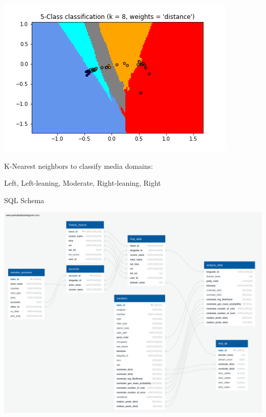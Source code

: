 \documentclass[12pt]{article}
\theoremstyle{example}
\theoremstyle{defn}
\begin{document}
\vspace*{-20pt}
\hspace*{\fill}
\includegraphics[scale=0.4]{5class.png}
\hspace*{\fill}

\vspace*{-10pt}
{\small
K-Nearest neighbors to classify media domains: 

\vspace*{-10pt}
\hspace*{\fill}Left, Left-leaning, Moderate, Right-leaning, Right
}

\clearpage


SQL Schema

\hspace*{\fill}
\includegraphics[scale=0.13]{QuickDBD-Media_Bias_DB.png}
\hspace*{\fill}
\end{document}

